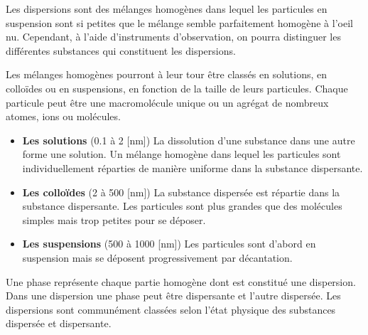 \documentclass[
  11pt,
  a4paper,
  openany]{book}
\providecommand{\tightlist}{%
  \setlength{\itemsep}{0pt}\setlength{\parskip}{0pt}}
\begin{document}
Les dispersions sont des mélanges homogènes dans lequel les particules en suspension sont si petites que le mélange semble parfaitement homogène à l'oeil nu. Cependant, à l'aide d'instruments d'observation, on pourra distinguer les différentes substances qui constituent les dispersions.

Les mélanges homogènes pourront à leur tour être classés en solutions, en colloïdes ou en suspensions, en fonction de la taille de leurs particules. Chaque particule peut être une macromolécule unique ou un agrégat de nombreux atomes, ions ou molécules.

\begin{itemize}
\tightlist
\item
  \textbf{Les solutions} (0.1 à 2 {[}nm{]})
  La dissolution d'une substance dans une autre forme une solution. Un mélange homogène dans lequel les particules sont individuellement réparties de manière uniforme dans la substance dispersante.
\item
  \textbf{Les colloïdes} (2 à 500 {[}nm{]})
  La substance dispersée est répartie dans la substance dispersante. Les particules sont plus grandes que des molécules simples mais trop petites pour se déposer.
\item
  \textbf{Les suspensions} (500 à 1000 {[}nm{]})
  Les particules sont d'abord en suspension mais se déposent progressivement par décantation.
\end{itemize}

Une phase représente chaque partie homogène dont est constitué une dispersion. Dans une dispersion une phase peut être dispersante et l'autre dispersée. Les dispersions sont communément classées selon l'état physique des substances dispersée et dispersante.
\end{document}

